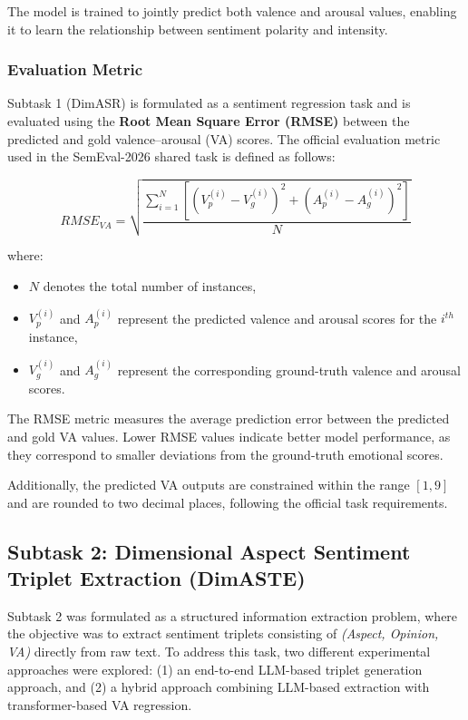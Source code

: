\documentclass{article}
\begin{document}
The model is trained to jointly predict both valence and arousal values, enabling it to learn the relationship between sentiment polarity and intensity.

\subsubsection{Evaluation Metric}

Subtask 1 (DimASR) is formulated as a sentiment regression task and is evaluated using the \textbf{Root Mean Square Error (RMSE)} between the predicted and gold valence–arousal (VA) scores. The official evaluation metric used in the SemEval-2026 shared task is defined as follows:

\begin{equation}
RMSE_{VA} =
\sqrt{
\frac{
\sum_{i=1}^{N}
\left[
\left(V_p^{(i)} - V_g^{(i)}\right)^2
+
\left(A_p^{(i)} - A_g^{(i)}\right)^2
\right]
}{N}
}
\end{equation}

where:
\begin{itemize}
    \item $N$ denotes the total number of instances,
    \item $V_p^{(i)}$ and $A_p^{(i)}$ represent the predicted valence and arousal scores for the $i^{th}$ instance,
    \item $V_g^{(i)}$ and $A_g^{(i)}$ represent the corresponding ground-truth valence and arousal scores.
\end{itemize}

The RMSE metric measures the average prediction error between the predicted and gold VA values. Lower RMSE values indicate better model performance, as they correspond to smaller deviations from the ground-truth emotional scores.

Additionally, the predicted VA outputs are constrained within the range $[1, 9]$ and are rounded to two decimal places, following the official task requirements.

\subsection{Subtask 2: Dimensional Aspect Sentiment Triplet Extraction (DimASTE)}
\label{subsec:subtask2_method}

Subtask 2 was formulated as a structured information extraction problem, where the objective was to extract sentiment triplets consisting of \textit{(Aspect, Opinion, VA)} directly from raw text. To address this task, two different experimental approaches were explored: (1) an end-to-end LLM-based triplet generation approach, and (2) a hybrid approach combining LLM-based extraction with transformer-based VA regression.
\end{document}
